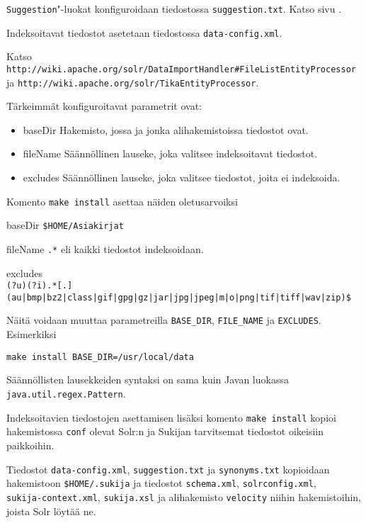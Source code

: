 \documentclass[12pt,a4paper]{scrartcl}
\begin{document}
\verb=Suggestion="-luokat konfiguroidaan tiedostossa
\verb|suggestion.txt|. Katso sivu .

\bigskip
Indeksoitavat tiedostot asetetaan tiedostossa \verb|data-config.xml|.

Katso \\
\verb|http://wiki.apache.org/solr/DataImportHandler#FileListEntityProcessor| \\
ja
\verb|http://wiki.apache.org/solr/TikaEntityProcessor|.

Tärkeimmät konfiguroitavat parametrit ovat:

\begin{itemize}
\item baseDir
Hakemisto, jossa ja jonka alihakemistoissa tiedostot ovat.

\item fileName
Säännöllinen lauseke, joka valitsee indeksoitavat tiedostot.

\item excludes
Säännöllinen lauseke, joka valitsee tiedostot, joita ei indeksoida.
\end{itemize}

Komento \verb|make install| asettaa näiden oletusarvoiksi

baseDir \verb|$HOME/Asiakirjat|

fileName \verb|.*| eli kaikki tiedostot indeksoidaan.

excludes \\
{\footnotesize \verb+(?u)(?i).*[.](au|bmp|bz2|class|gif|gpg|gz|jar|jpg|jpeg|m|o|png|tif|tiff|wav|zip)$+}


Näitä voidaan muuttaa parametreilla \verb|BASE_DIR|,
\verb|FILE_NAME| ja
\verb|EXCLUDES|. Esimerkiksi

\verb|make install BASE_DIR=/usr/local/data|

Säännöllisten lausekkeiden syntaksi on sama kuin Javan luokassa \\
\verb=java.util.regex.Pattern=.

Indeksoitavien tiedostojen asettamisen lisäksi komento
\verb=make install= kopioi hakemistossa \verb=conf= olevat Solr:n ja
Sukijan tarvitsemat tiedostot oikeisiin paikkoihin.

Tiedostot
\verb=data-config.xml=,
\verb=suggestion.txt= ja
\verb=synonyms.txt=
kopioidaan hakemistoon \verb=$HOME/.sukija=
ja tiedostot
\verb=schema.xml=,
\verb=solrconfig.xml=, \\
\verb=sukija-context.xml=,
\verb=sukija.xsl= ja
alihakemisto \verb=velocity=
niihin hakemistoihin, joista Solr löytää ne.
\end{document}
